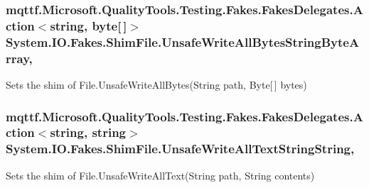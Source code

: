 \hypertarget{class_system_1_1_i_o_1_1_fakes_1_1_shim_file_a95b3246e7b048e0297a5fa5719fbcec6}{
\subsubsection[{Unsafe\-Write\-All\-Bytes\-String\-Byte\-Array}]{\setlength{\rightskip}{0pt plus 5cm}mqttf.\-Microsoft.\-Quality\-Tools.\-Testing.\-Fakes.\-Fakes\-Delegates.\-Action$<$string, byte\mbox{[}$\,$\mbox{]}$>$ System.\-I\-O.\-Fakes.\-Shim\-File.\-Unsafe\-Write\-All\-Bytes\-String\-Byte\-Array\hspace{0.3cm}{\ttfamily [static]}, {\ttfamily [set]}}}\label{class_system_1_1_i_o_1_1_fakes_1_1_shim_file_a95b3246e7b048e0297a5fa5719fbcec6}


Sets the shim of File.\-Unsafe\-Write\-All\-Bytes(\-String path, Byte\mbox{[}$\,$\mbox{]} bytes)

\hypertarget{class_system_1_1_i_o_1_1_fakes_1_1_shim_file_a034bb3bde19a6f78525691eef8ca958d}{
\subsubsection[{Unsafe\-Write\-All\-Text\-String\-String}]{\setlength{\rightskip}{0pt plus 5cm}mqttf.\-Microsoft.\-Quality\-Tools.\-Testing.\-Fakes.\-Fakes\-Delegates.\-Action$<$string, string$>$ System.\-I\-O.\-Fakes.\-Shim\-File.\-Unsafe\-Write\-All\-Text\-String\-String\hspace{0.3cm}{\ttfamily [static]}, {\ttfamily [set]}}}\label{class_system_1_1_i_o_1_1_fakes_1_1_shim_file_a034bb3bde19a6f78525691eef8ca958d}


Sets the shim of File.\-Unsafe\-Write\-All\-Text(\-String path, String contents)

